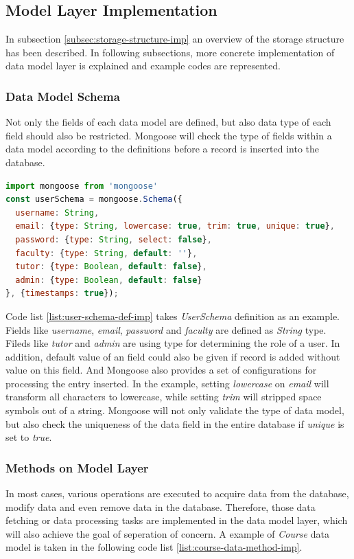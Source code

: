 \subsection{Model Layer Implementation}
In subsection \ref{subsec:storage-structure-imp} an overview of the storage structure has been described. In following subsections, more concrete implementation of data model layer is explained and example codes are represented.

\subsubsection{Data Model Schema}

Not only the fields of each data model are defined, but also data type of each field should also be restricted. Mongoose will check the type of fields within a data model according to the definitions before a record is inserted into the database. 

\begin{lstlisting}[language=JavaScript, caption=Example: user schema definition within Mongoose, label={list:user-schema-def-imp}]
import mongoose from 'mongoose'
const userSchema = mongoose.Schema({
  username: String,
  email: {type: String, lowercase: true, trim: true, unique: true},
  password: {type: String, select: false},
  faculty: {type: String, default: ''},
  tutor: {type: Boolean, default: false},
  admin: {type: Boolean, default: false}
}, {timestamps: true});
\end{lstlisting}

Code list \ref{list:user-schema-def-imp} takes \textit{UserSchema} definition as an example. Fields like \textit{username}, \textit{email}, \textit{password} and \textit{faculty} are defined as \textit{String} type. Fileds like \textit{tutor} and \textit{admin} are using  type for determining the role of a user. In addition, default value of an field could also be given if record is added without value on this field. And Mongoose also provides a set of configurations for processing the entry inserted. In the example, setting \textit{lowercase} on \textit{email} will transform all characters to lowercase, while setting \textit{trim} will stripped space symbols out of a string. Mongoose will not only validate the type of data model, but also check the uniqueness of the data field in the entire database if \textit{unique} is set to \textit{true}. 

\subsubsection{Methods on Model Layer}
In most cases, various operations are executed to acquire data from the database, modify data and even remove data in the database. Therefore, those data fetching or data processing tasks are implemented in the data model layer, which will also achieve the goal of seperation of concern. A example of \textit{Course} data model is taken in the following code list \ref{list:course-data-method-imp}.

